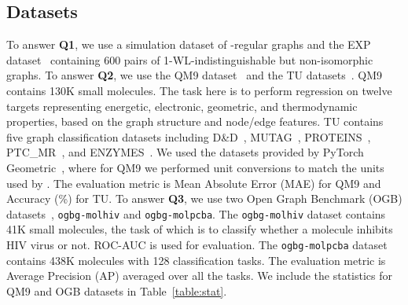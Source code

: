 \documentclass{article}
\begin{document}
\subsection{Datasets}
To answer \textbf{Q1}, we use a simulation dataset of -regular graphs and the EXP dataset~\citep{abboud2020surprising} containing 600 pairs of 1-WL-indistinguishable but non-isomorphic graphs. To answer \textbf{Q2}, we use the QM9 dataset~\citep{ramakrishnan2014quantum,wu2018moleculenet} and the TU datasets~\citep{KKMMN2016}. QM9 contains 130K small molecules. The task here is to perform regression
on twelve targets representing energetic, electronic, geometric, and thermodynamic properties, based on the graph structure and node/edge features. TU contains five graph classification datasets including D\&D~\citep{dobson2003distinguishing}, MUTAG~\citep{debnath1991structure}, PROTEINS~\citep{dobson2003distinguishing}, PTC\_MR~\citep{toivonen2003statistical}, and ENZYMES~\citep{schomburg2004brenda}. We used the datasets provided by PyTorch Geometric~\citep{fey2019fast}, where for QM9 we performed unit conversions to match the units used by \citep{morris2019weisfeiler}. The evaluation metric is Mean Absolute Error (MAE) for QM9 and Accuracy (\%) for TU.
To answer \textbf{Q3}, we use two Open Graph Benchmark (OGB) datasets~\citep{hu2020open}, \texttt{ogbg-molhiv} and \texttt{ogbg-molpcba}. The \texttt{ogbg-molhiv} dataset contains 41K small molecules, the task of which is to classify whether a molecule inhibits HIV virus or not. ROC-AUC is used for evaluation. The \texttt{ogbg-molpcba} dataset contains 438K molecules with 128 classification tasks. The evaluation metric is Average Precision (AP) averaged over all the tasks. We include the statistics for QM9 and OGB datasets in Table~\ref{table:stat}.





\captionsetup[table]{font=large}
\begin{table*}[t]
\begin{center}
\end{center}
\vspace{-10pt}
\end{table*}
\captionsetup[table]{font=Large}
\end{document}
